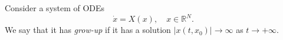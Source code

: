 \documentclass[11pt]{article}
\theoremstyle{Mystyle}
\begin{document}


Consider a system of ODEs 
\begin{equation}
\label{0}
\dot{x} = X(x),\quad x\in\mathbb{R}^N.
\end{equation}
 We say that %
it has \textit{grow-up} if it has a solution $|x(t,x_0)|\rightarrow\infty$ as $t\rightarrow +\infty$. 
\end{document}
